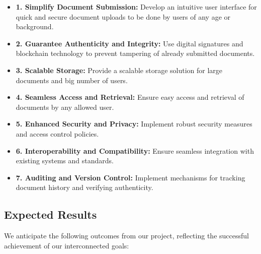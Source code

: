 \documentclass[a4paper,11pt]{article}
\begin{document}
            \begin{itemize}
             \item \textbf{1. Simplify Document Submission:} Develop an intuitive user interface for quick and secure document uploads to be done by users of any age or background.
            
             \item \textbf{2. Guarantee Authenticity and Integrity:} Use digital signatures and blockchain technology to prevent tampering of already submitted documents.
    
             \item \textbf{3. Scalable Storage:} Provide a scalable storage solution for large documents and big number of users.
    
             \item \textbf{4. Seamless Access and Retrieval:} Ensure easy access and retrieval of documents by any allowed user.
    
             \item \textbf{5. Enhanced Security and Privacy:} Implement robust security measures and access control policies.
    
             \item \textbf{6. Interoperability and Compatibility:} Ensure seamless integration with existing systems and standards.

             \item \textbf{7. Auditing and Version Control:} Implement mechanisms for tracking document history and verifying authenticity.
            \end{itemize}
            
        \subsection{Expected Results}
            We anticipate the following outcomes from our project, reflecting the successful achievement of our interconnected goals:
    
\end{document}
